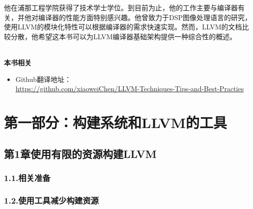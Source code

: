 \documentclass[11pt,a4paper,UTF8]{book}
\begin{document}
	他在浦那工程学院获得了技术学士学位。到目前为止，他的工作主要与编译器有关，并他对编译器的性能方面特别感兴趣。他曾致力于DSP图像处理语言的研究，使用LLVM的模块化特性可以根据编译器的需求快速实现。然而，LLVM的文档比较分散，他希望这本书可以为LLVM编译器基础架构提供一种综合性的概述。
	
	
	\hspace*{\fill} \\ %
	\noindent\textbf{本书相关}
	\begin{itemize}
		\item Github翻译地址：\\\url{https://github.com/xiaoweiChen/LLVM-Techniques-Tips-and-Best-Practies}
	\end{itemize}
	\newpage
	
	\pagestyle{empty}
	
	\newpage
	
	\tableofcontents
	\newpage
	
	
	\color{white}
	\section*{ 第一部分：构建系统和LLVM的工具}
	\pagecolor{mygray}
	\textbf{}
	\color{black}
	\pagecolor{white}
	
	\subsection*{ 第1章\hspace{0.5cm}使用有限的资源构建LLVM}
	
	
	\subsubsection*{ 1.1.\hspace{0.2cm}相关准备}
	
	
	\subsubsection*{ 1.2.\hspace{0.2cm}使用工具减少构建资源}
	
	
\end{document}
